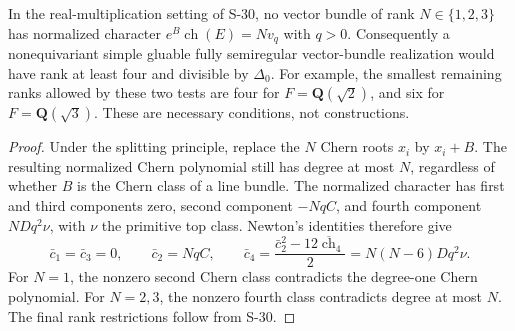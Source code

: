 \begin{proposition}
\label{prop:semireg-rm-low-rank-bundles}
In the real-multiplication setting of S-30, no vector
bundle of rank $N\in\{1,2,3\}$ has normalized character
$e^B\operatorname{ch}(E)=Nv_q$ with $q>0$.
Consequently a nonequivariant simple gluable fully
semiregular vector-bundle realization would have rank
at least four and divisible by $\Delta_0$.
For example, the smallest remaining ranks allowed by
these two tests are four for $F=\mathbf Q(\sqrt2)$,
and six for $F=\mathbf Q(\sqrt3)$.
These are necessary conditions, not constructions.
\end{proposition}
\begin{proof}
Under the splitting principle, replace the $N$ Chern
roots $x_i$ by $x_i+B$. The resulting normalized Chern
polynomial still has degree at most $N$, regardless of
whether $B$ is the Chern class of a line bundle.
The normalized character has first and third components
zero, second component $-NqC$, and fourth component
$NDq^2\nu$, with $\nu$ the primitive top class.
Newton's identities therefore give
\[
 \bar c_1=\bar c_3=0,\qquad
 \bar c_2=NqC,\qquad
 \bar c_4=\frac{\bar c_2^2-12\overline{\operatorname{ch}}_4}{2}
          =N(N-6)Dq^2\nu.
 \tag{S31.1}
\]
For $N=1$, the nonzero second Chern class contradicts
the degree-one Chern polynomial. For $N=2,3$, the
nonzero fourth class contradicts degree at most $N$.
The final rank restrictions follow from S-30.
\end{proof}

